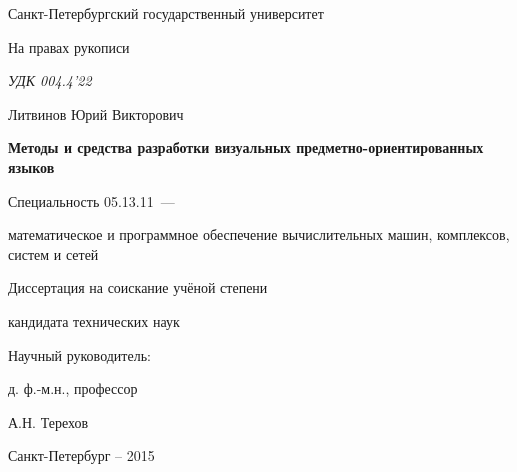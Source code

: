 \thispagestyle{empty}

\begin{center}
Санкт-Петербургский государственный университет\par
\par 
\par
\end{center}

\vspace{20mm}
\begin{flushright}
На правах рукописи

{\sl УДК 004.4'22}
\end{flushright}

\vspace{25mm}
\begin{center}
{\large Литвинов Юрий Викторович}
\end{center}

\vspace{5mm}
\begin{center}
{\bf \large Методы и средства разработки визуальных предметно-ориентированных языков
\par}

\vspace{10mm}
{%
Специальность 05.13.11~---

математическое и программное обеспечение вычислительных машин, комплексов, систем и сетей
}

\vspace{10mm}
Диссертация на соискание учёной степени

кандидата технических наук
\end{center}

\vspace{20mm}
\begin{flushright}
Научный руководитель:

д. ф.-м.н., профессор

А.Н. Терехов

\end{flushright}

\vspace{20mm}
\begin{center}
{Санкт-Петербург -- 2015}
\end{center}

\newpage